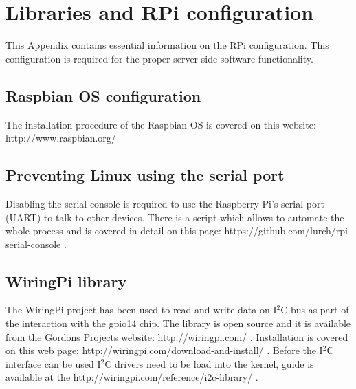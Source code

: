 \chapter{Libraries and RPi configuration}
This Appendix contains essential information on the RPi configuration. This configuration is required for the proper server side software functionality.

\section{Raspbian OS configuration}
The installation procedure of the Raspbian OS is covered on this website: http://www.raspbian.org/

\section{Preventing Linux using the serial port}
Disabling the serial console is required to use the Raspberry Pi's serial port (UART) to talk to other devices. There is a script which allows to automate the whole process and is covered in detail on this page: https://github.com/lurch/rpi-serial-console .

\section{WiringPi library}
The WiringPi project has been used to read and write data on I$^2$C bus as part of the interaction with the gpio14 chip. The library is open source and it is available from the Gordons Projects website: http://wiringpi.com/ . Installation is covered on this web page: http://wiringpi.com/download-and-install/ . Before the I$^2$C interface can be used I$^2$C drivers need to be load into the kernel, guide is available at the http://wiringpi.com/reference/i2c-library/ .  